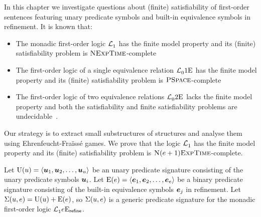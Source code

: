 
In this chapter we investigate questions about (finite) satisfiability of
first-order sentences featuring unary predicate symbols and built-in equivalence
symbols in refinement.
It is known that:
\begin{itemize}
  \item The monadic first-order logic $\mathcal{L}^{{}}_{1}$ has the finite model
  property and its (finite) satisfiability problem is
  $\text{\normalfont{\scshape NExpTime}}$-complete~\cite{Lowenheim1915}
  \item The first-order logic of a single equivalence relation
  $\mathcal{L}^{{}}_{0}{1}\mathrm{E}_{{}}$ has the finite model property and its (finite)
  satisfiability problem is $\text{\normalfont{\scshape PSpace}}$-complete~\cite{boerger1997classical}
  \item The first-order logic of two equivalence relations
  $\mathcal{L}^{{}}_{0}{2}\mathrm{E}_{{}}$ lacks the finite model property and both the
  satisfiability and finite satisfiability problems are
  undecidable~\cite{Janiczak1953}.
\end{itemize}
Our strategy is to extract small substructures of structures and analyse them
using Ehrenfeucht-Fra\"{i}ss\'{e} games.
We prove that the logic $\mathcal{L}^{{}}_{1}$ has the finite model property and its
(finite) satisfiability problem is $\text{\normalfont{\scshape N}}(e+1)\text{\normalfont{\scshape ExpTime}}$-complete.

Let ${\mathrm{U}}(u) = \left\langle \bm{u}_{1},\bm{u}_{2},\dots,\bm{u}_{u} \right\rangle$ be an unary predicate
signature consisting of the unary predicate symbols $\bm{u}_{i}$.
Let ${\mathrm{E}}(e) = \left\langle \bm{e}_{1},\bm{e}_{2},\dots,\bm{e}_{e} \right\rangle$ be a binary predicate
signature consisting of the built-in equivalence symbols $\bm{e}_{j}$ in refinement.
Let $\mathrm{\Sigma}(u,e) = {\mathrm{U}}(u) + {\mathrm{E}}(e)$, so $\mathrm{\Sigma}(u,e)$ is a generic
predicate signature for the monadic first-order logic
$\mathcal{L}^{{}}_{1}{e}\mathrm{E}_{\mathsf{refine}}$.